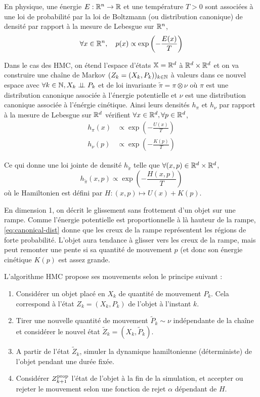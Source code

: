 \documentclass[10pt,a4paper]{article}
\begin{document}
\begin{Def}
  En physique, une énergie $E : \mathbb{R}^n \to \mathbb{R}$ et une température $T > 0$ sont associées à une loi de probabilité par la loi de Boltzmann (ou distribution canonique) de densité par rapport à la mesure de Lebesgue sur $\mathbb{R}^n$,
  $$\forall x \in \mathbb{R}^n,  \quad p(x) \propto \exp \left( -\frac{E(x)}{T} \right)$$
\end{Def}


Dans le cas des HMC, on étend l'espace d'états $\mathbb{X} = \mathbb{R}^d$ à $\mathbb{R}^d \times \mathbb{R}^d$ et on va construire une chaîne de Markov $(Z_k = (X_k, P_k))_{k \in \mathbb{N}}$ à valeurs dans ce nouvel espace avec $\forall k \in \mathbb{N}, X_k \perp\!\!\!\perp P_k$ et de loi invariante $\widetilde{\pi} = \pi \otimes \nu$ où $\pi$ est une distribution canonique associée à l'énergie potentielle et $\nu$ est une distribution canonique associée à l'énérgie cinétique. Ainsi leurs densités $h_\pi$ et $h_\nu$ par rapport à la mesure de Lebesgue sur $\mathbb{R}^d$ vérifient $\forall x \in \mathbb{R}^d, \forall p \in \mathbb{R}^d$,
\begin{align*}
  h_\pi(x) & \propto  \exp \left( -\frac{U(x)}{T} \right) \\
  h_\nu(p) & \propto  \exp \left( -\frac{K(p)}{T} \right)
\end{align*}

Ce qui donne une loi jointe de densité $h_{\widetilde{\pi}}$ telle que $\forall (x,p) \in \mathbb{R}^d \times \mathbb{R}^d$, 
\begin{equation} \label{eq:canonical-dist}
h_{\widetilde{\pi}}(x,p) \propto \exp \left( -\frac{H(x,p)}{T} \right)
\end{equation}
où le Hamiltonien est défini par $H : (x,p) \mapsto U(x) + K(p)$.

\begin{Rque}
En dimension 1, on décrit le glissement sans frottement d'un objet sur une rampe. Comme l'énergie potentielle est proportionnelle à là hauteur de la rampe, \eqref{eq:canonical-dist} donne que les creux de la rampe représentent les régions de forte probabilité. L'objet aura tendance à glisser vers les creux de la rampe, mais peut remonter une pente si sa quantité de mouvement $p$ (et donc son énergie cinétique $K(p)$ est assez grande.
\end{Rque}

L'algorithme HMC propose ses mouvements selon le principe suivant : 
\begin{enumerate}
\item Considérer un objet placé en $X_k$ de quantité de mouvement $P_k$. Cela correspond à l'état $Z_k = (X_k, P_k)$ de l'objet à l'instant $k$.
\item Tirer une nouvelle quantité de mouvement $\tilde{P}_k \sim \nu$ indépendante de la chaîne et considérer le nouvel état $\tilde{Z}_k = (X_k, \tilde{P}_k)$. 
\item A partir de l'état $\tilde{Z}_k$, simuler la dynamique hamiltonienne (déterministe) de l'objet pendant une durée fixée.
\item Considérer $Z_{k+1}^{\rm prop}$ l'état de l'objet à la fin de la simulation, et accepter ou rejeter le mouvement selon une fonction de rejet $\alpha$ dépendant de $H$. 
\end{enumerate}
\end{document}
